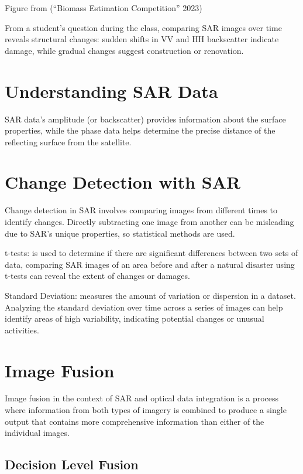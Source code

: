 \documentclass[
  letterpaper,
  DIV=11,
  numbers=noendperiod]{scrreprt}
\begin{document}
Figure from ({``Biomass Estimation Competition''} 2023)

From a student's question during the class, comparing SAR images over
time reveals structural changes: sudden shifts in VV and HH backscatter
indicate damage, while gradual changes suggest construction or
renovation.

\section{Understanding SAR Data}\label{understanding-sar-data}

SAR data's amplitude (or backscatter) provides information about the
surface properties, while the phase data helps determine the precise
distance of the reflecting surface from the satellite.

\section{Change Detection with SAR}\label{change-detection-with-sar}

Change detection in SAR involves comparing images from different times
to identify changes. Directly subtracting one image from another can be
misleading due to SAR's unique properties, so statistical methods are
used.

t-tests: is used to determine if there are significant differences
between two sets of data, comparing SAR images of an area before and
after a natural disaster using t-tests can reveal the extent of changes
or damages.

Standard Deviation: measures the amount of variation or dispersion in a
dataset. Analyzing the standard deviation over time across a series of
images can help identify areas of high variability, indicating potential
changes or unusual activities.

\section{Image Fusion}\label{image-fusion}

Image fusion in the context of SAR and optical data integration is a
process where information from both types of imagery is combined to
produce a single output that contains more comprehensive information
than either of the individual images.

\subsection{Decision Level Fusion}\label{decision-level-fusion}
\end{document}
